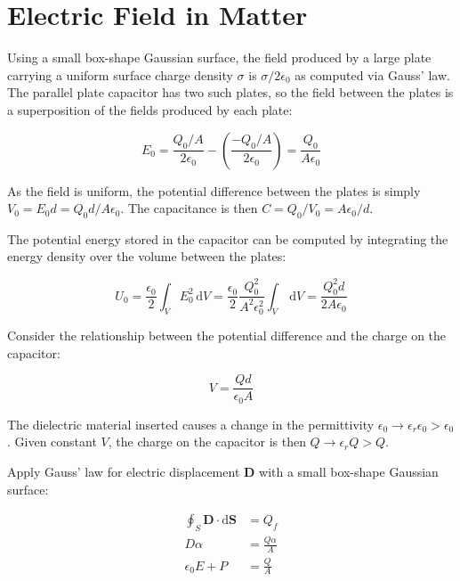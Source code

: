 \documentclass[12pt]{article}
\begin{document}



\pagebreak
\section*{Electric Field in Matter}



Using a small box-shape Gaussian surface, the field produced by a large plate carrying a uniform surface charge density $\sigma$ is $\sigma/2\epsilon_{0}$ as computed via Gauss' law. The parallel plate capacitor has two such plates, so the field between the plates is a superposition of the fields produced by each plate:

\begin{equation}
    E_{0} = \frac{Q_{0}/A}{2\epsilon_{0}} - \left( \frac{-Q_{0}/A}{2\epsilon_{0}} \right) = \frac{Q_{0}}{A\epsilon_{0}}
\end{equation}

As the field is uniform, the potential difference between the plates is simply $V_{0} = E_{0}d = Q_{0}d/A\epsilon_{0}$. The capacitance is then $C = Q_{0}/V_{0} = A\epsilon_{0}/d$.

The potential energy stored in the capacitor can be computed by integrating the energy density over the volume between the plates:

\begin{equation}
    U_{0} = \frac{\epsilon_{0}}{2} \int_{V} E_{0}^{2} \, \mathrm{d}V = \frac{\epsilon_{0}}{2} \frac{Q_{0}^{2}}{A^{2}\epsilon_{0}^{2}} \int_{V} \, \mathrm{d}V = \frac{Q_{0}^{2}d}{2A\epsilon_{0}}
\end{equation}

Consider the relationship between the potential difference and the charge on the capacitor:

\begin{equation}
    V = \frac{Qd}{\epsilon_{0}A}
\end{equation}

The dielectric material inserted causes a change in the permittivity $\epsilon_{0} \to \epsilon_{r} \epsilon_{0} > \epsilon_{0}$. Given constant $V$, the charge on the capacitor is then $Q \to \epsilon_{r}Q > Q$.

Apply Gauss' law for electric displacement $\mathbf{D}$ with a small box-shape Gaussian surface:

\begin{equation}
\begin{split}
    \oint_{S} \mathbf{D} \cdot \mathrm{d}\mathbf{S} &= Q_{f} \\
    D \alpha &= \frac{Q\alpha}{A} \\
    \epsilon_{0} E + P &= \frac{Q}{A}
\end{split}
\end{equation}
\end{document}
